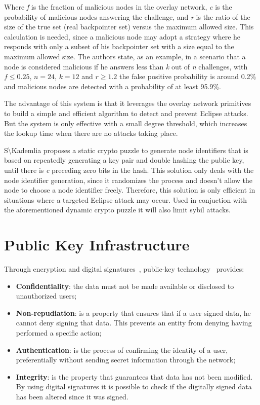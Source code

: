 Where \textit{f} is the fraction of malicious nodes in the overlay network, \textit{c} is the probability of malicious nodes answering the challenge, and \textit{r} is the ratio of the size of the true set (real backpointer set) versus the maximum allowed size. This calculation is needed, since a malicious node may adopt a strategy where he responds with only a subset of his backpointer set with a size equal to the maximum allowed size.
The authors state, as an example, in a scenario that a node is considered malicious if he answers less than \textit{k} out of \textit{n} challenges, with \(f \leq 0.25\), \(n=24\), \(k=12\) and \(r \geq 1.2\) the false positive probability is around 0.2\% and malicious nodes are detected with a probability of at least 95.9\%.

The advantage of this system is that it leverages the overlay network primitives to build a simple and efficient algorithm to detect and prevent Eclipse attacks. But the system is only effective with a small degree threshold, which increases the lookup time when there are no attacks taking place.

S\textbackslash{Kademlia} proposes a static crypto puzzle to generate node identifiers that is based on repeatedly generating a key pair and double hashing the public key, until there is \textit{c} preceding zero bits in the hash.
This solution only deals with the node identifier generation, since it randomizes the process and doesn't allow the node to choose a node identifier freely.
Therefore, this solution is only efficient in situations where a targeted Eclipse attack may occur. Used in conjuction with the aforementioned dynamic crypto puzzle it will also limit sybil attacks.

\section{Public Key Infrastructure}
Through encryption and digital signatures~\cite{Rivest1978}, public-key technology~\cite{Diffie1976} provides:
\begin{itemize}
  \item \textbf{Confidentiality}: the data must not be made available or disclosed to unauthorized users;
  \item \textbf{Non-repudiation}: is a property that ensures that if a user signed data, he cannot deny signing that data. This prevents an entity from denying having performed a specific action;
  \item \textbf{Authentication}: is the process of confirming the identity of a user, preferentially without sending secret information through the network;
  \item \textbf{Integrity}: is the property that guarantees that data has not been modified. By using digital signatures it is possible to check if the digitally signed data has been altered since it was signed.
\end{itemize}

